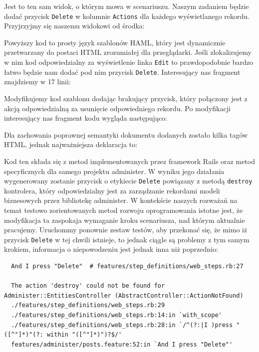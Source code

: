   Jest to ten sam widok, o którym mowa w scenariuszu. Naszym zadaniem będzie dodać przycisk \verb+Delete+ w kolumnie \verb+Actions+ dla każdego wyświetlanego rekordu. Przyjrzyjmy się naszemu widokowi od środka:
  
  
  
  Powyższy kod to prosty język szablonów HAML, który jest dynamicznie przetwarzany do postaci HTML zrozumiałej dla przeglądarki. Jeśli zlokalizujemy w nim kod odpowiedzialny za wyświetlenie linka \verb+Edit+ to prawdopodobnie bardzo łatwo będzie nam dodać pod nim przycisk \verb+Delete+. Interesujący nas fragment znajdziemy w 17 linii:
  
  
  
  Modyfikujemy kod szablonu dodając brakujący przycisk, który połączony jest z akcją odpowiedzialną za usunięcie odpowiedniego rekordu. Po modyfikacji interesujący nas fragment kodu wygląda następująco:
  
  
  
  Dla zachowania poprawnej semantyki dokumentu dodanych zostało kilka tagów HTML, jednak najważniejsza deklaracja to:
  
  
  
  Kod ten składa się z metod implementowanych przez framework Rails oraz metod specyficznych dla samego projektu administer. W wyniku jego działania wygenerowany zostanie przycisk o etykiecie \verb+Delete+ powiązany z metodą \verb+destroy+ kontrolera, który odpowiedzialny jest za zarządzanie rekordami modeli biznesowych przez bibliotekę administer. W kontekście naszych rozważań na temat testowo zorientowanych metod rozwoju oprogramowania istotne jest, że modyfikacja ta zaspokaja wymaganie kroku scenariusza, nad którym aktualnie pracujemy. Uruchommy ponownie zestaw testów, aby przekonać się, że mimo iż przycisk \verb+Delete+ w tej chwili istnieje, to jednak ciągle są problemy z tym samym krokiem, informacja o niepowodzeniu jest jednak inna niż poprzednio:
  
  \begin{lstlisting}
  And I press "Delete"  # features/step_definitions/web_steps.rb:27
  
  The action 'destroy' could not be found for Administer::EntitiesController (AbstractController::ActionNotFound)
  ./features/step_definitions/web_steps.rb:29
  ./features/step_definitions/web_steps.rb:14:in `with_scope'
  ./features/step_definitions/web_steps.rb:28:in `/^(?:|I )press "([^"]*)"(?: within "([^"]*)")?$/'
  features/administer/posts.feature:52:in `And I press "Delete"'
  \end{lstlisting}
  
